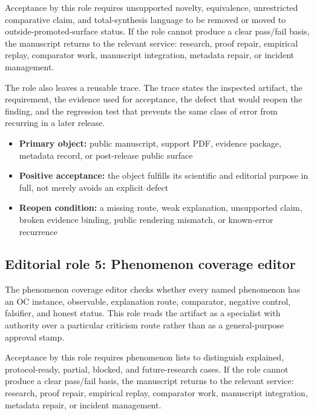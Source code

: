 Acceptance by this role requires unsupported novelty, equivalence, unrestricted comparative claim, and total-synthesis language to be removed or moved to outside-promoted-surface status. If the role cannot produce a clear pass/fail basis, the manuscript returns to the relevant service: research, proof repair, empirical replay, comparator work, manuscript integration, metadata repair, or incident management.


The role also leaves a reusable trace. The trace states the inspected artifact, the requirement, the evidence used for acceptance, the defect that would reopen the finding, and the regression test that prevents the same class of error from recurring in a later release.


\begin{itemize}[leftmargin=1.8em]

\item \textbf{Primary object:} public manuscript, support PDF, evidence package, metadata record, or post-release public surface

\item \textbf{Positive acceptance:} the object fulfills its scientific and editorial purpose in full, not merely avoids an explicit defect

\item \textbf{Reopen condition:} a missing route, weak explanation, unsupported claim, broken evidence binding, public rendering mismatch, or known-error recurrence

\end{itemize}

\subsection{Editorial role 5: Phenomenon coverage editor}

The phenomenon coverage editor checks whether every named phenomenon has an OC instance, observable, explanation route, comparator, negative control, falsifier, and honest status. This role reads the artifact as a specialist with authority over a particular criticism route rather than as a general-purpose approval stamp.


Acceptance by this role requires phenomenon lists to distinguish explained, protocol-ready, partial, blocked, and future-research cases. If the role cannot produce a clear pass/fail basis, the manuscript returns to the relevant service: research, proof repair, empirical replay, comparator work, manuscript integration, metadata repair, or incident management.


